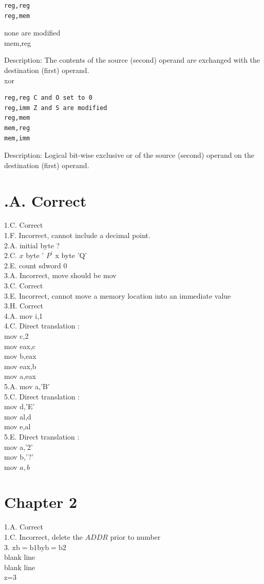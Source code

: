 \documentclass[10pt]{book}
\begin{document}
\begin{verbatim}
reg,reg
reg,mem
\end{verbatim}

none are modified\\
mem,reg

Description: The contents of the source (second) operand are exchanged with the destination (first) operand.\\
xor

\begin{verbatim}
reg,reg C and O set to 0
reg,imm Z and S are modified
reg,mem
mem,reg
mem,imm
\end{verbatim}

Description: Logical bit-wise exclusive or of the source (second) operand on the destination (first) operand.

\section{.A. Correct}
1.C. Correct\\
1.F. Incorrect, cannot include a decimal point.\\
2.A. initial byte ?\\
2.C. $x$ byte ' $P^{\prime}$ x byte 'Q'\\
2.E. count sdword 0\\
3.A. Incorrect, move should be mov\\
3.C. Correct\\
3.E. Incorrect, cannot move a memory location into an immediate value\\
3.H. Correct\\
4.A. mov i,1\\
4.C. Direct translation :\\
mov c,2\\
mov eax,c\\
mov b,eax\\
mov eax,b\\
mov a,eax\\
5.A. mov a,'B'\\
5.C. Direct translation :\\
mov d,'E'\\
mov al,d\\
mov e,al\\
5.E. Direct translation :\\
mov a,'2'\\
mov b,'?'\\
mov $a, b$

\section{Chapter 2}
1.A. Correct\\
1.C. Incorrect, delete the $A D D R$ prior to number\\
3. $\mathrm{xb}=\mathrm{b} 1 \mathrm{byb}=\mathrm{b} 2$\\
blank line\\
blank line\\
z=3
\end{document}
